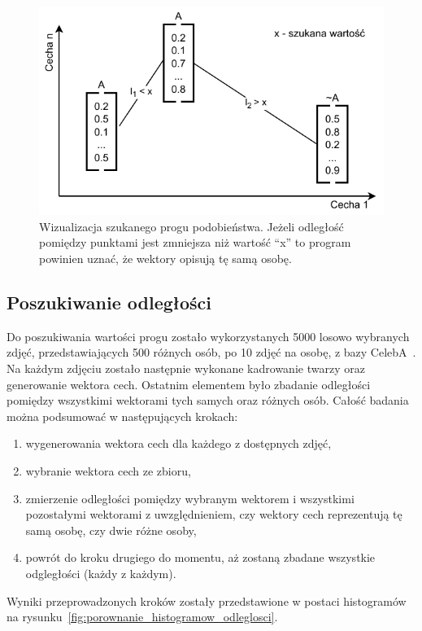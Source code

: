 \begin{figure}[H]
    \centering
    \includegraphics[width=1\textwidth]{./images/szukanie_progu}
    \caption{ Wizualizacja szukanego progu podobieństwa. Jeżeli odległość pomiędzy punktami jest
    zmniejsza niż wartość ``x'' to program powinien uznać, że wektory opisują tę samą osobę. }
    \customsource
    \label{fig:szukanie_progu}
\end{figure}

\pagebreak

\subsection{Poszukiwanie odległości}

Do poszukiwania wartości progu zostało wykorzystanych \num{5000} losowo wybranych zdjęć,
przedstawiających \num{500} różnych osób, po \num{10} zdjęć na osobę,
z bazy CelebA~\cite{liu2015faceattributes}.
Na każdym zdjęciu zostało następnie wykonane kadrowanie twarzy oraz generowanie wektora cech.
Ostatnim elementem było zbadanie odległości pomiędzy wszystkimi wektorami tych samych oraz różnych osób.
Całość badania można podsumować w następujących krokach:
\begin{enumerate}
    \item wygenerowania wektora cech dla każdego z dostępnych zdjęć,
    \item wybranie wektora cech ze zbioru,
    \item zmierzenie odległości pomiędzy wybranym wektorem i wszystkimi pozostałymi wektorami z uwzględnieniem,
    czy wektory cech reprezentują tę samą osobę, czy dwie różne osoby,
    \item powrót do kroku drugiego do momentu, aż zostaną zbadane wszystkie odgległości (każdy z każdym).
\end{enumerate}
Wyniki przeprowadzonych kroków zostały przedstawione w postaci histogramów na rysunku~\ref{fig:porownanie_histogramow_odleglosci}.

